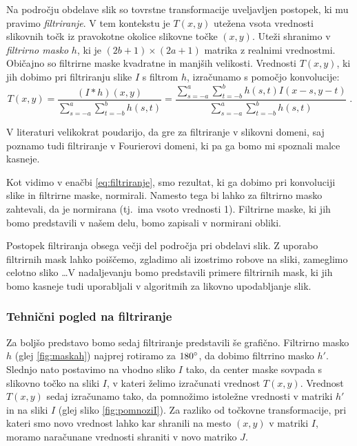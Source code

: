 Na področju obdelave slik so tovrstne transformacije uveljavljen postopek, ki mu pravimo \emph{filtriranje}. V tem kontekstu je $T(x, y)$ utežena vsota vrednosti slikovnih točk iz pravokotne okolice slikovne točke $(x, y)$. Uteži shranimo v \emph{filtrirno masko} $h$, ki je $(2b + 1)\times(2a + 1)$ matrika z realnimi vrednostmi. Običajno so filtrirne maske kvadratne in manjših velikosti. Vrednosti $T(x, y)$, ki jih dobimo pri filtriranju slike $I$ s filtrom $h$, izračunamo s pomočjo konvolucije:
%
\begin{equation}\label{eq:filtriranje}
T(x, y) = \frac{(I \ast h)(x,y)}{\sum_{s=-a}^{a} \sum_{t=-b}^{b} h(s, t)} = \frac{\sum_{s=-a}^{a} \sum_{t=-b}^{b} h(s, t) I(x-s, y-t)}{\sum_{s=-a}^{a} \sum_{t=-b}^{b} h(s, t)} \;.
\end{equation}
%
\begin{opomba}
V literaturi velikokrat poudarijo, da gre za filtriranje v slikovni domeni, saj poznamo tudi filtriranje v Fourierovi domeni, ki pa ga bomo mi spoznali malce kasneje.
\end{opomba}
%
\begin{opomba}
Kot vidimo v enačbi \eqref{eq:filtriranje}, smo rezultat, ki ga dobimo pri konvoluciji slike in filtrirne maske, normirali. Namesto tega bi lahko za filtrirno masko zahtevali, da je normirana (tj.\ ima vsoto vrednosti 1). Filtrirne maske, ki jih bomo predstavili v našem delu, bomo zapisali v normirani obliki. 
\end{opomba}
%
Postopek filtriranja obsega večji del področja pri obdelavi slik. Z uporabo filtrirnih mask lahko poiščemo, zgladimo ali izostrimo robove na sliki, zameglimo celotno sliko \ldots V nadaljevanju bomo predstavili primere filtrirnih mask, ki jih bomo kasneje tudi uporabljali v algoritmih za likovno upodabljanje slik.
\subsubsection{Tehnični pogled na filtriranje}\label{sec:TehnicniPogledNaFiltriranje}
%
Za boljšo predstavo bomo sedaj filtriranje predstavili še grafično. Filtrirno masko $h$ (glej \ref{fig:maskah}) najprej rotiramo za $180 \degree$, da dobimo filtrrino masko $h'$. Slednjo nato postavimo na vhodno sliko $I$ tako, da center maske sovpada s slikovno točko na sliki $I$, v kateri želimo izračunati vrednost $T(x, y)$. Vrednost $T(x, y)$ sedaj izračunamo tako, da pomnožimo istoležne vrednosti v matriki $h'$ in na sliki $I$ (glej sliko \ref{fig:pomnoziI}). Za razliko od točkovne transformacije, pri kateri smo novo vrednost lahko kar shranili na mesto $(x, y)$ v matriki $I$, moramo naračunane vrednosti shraniti v novo matriko $J$.

